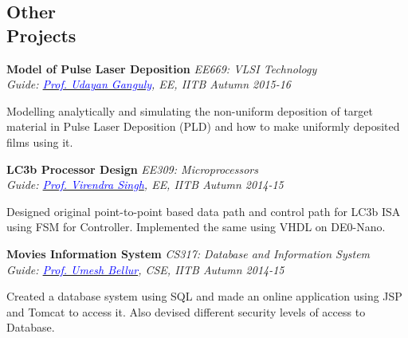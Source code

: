 \documentclass[margin,line]{res}
\newenvironment{list1}{
  \begin{list}{\ding{113}}{%
      \setlength{\itemsep}{0in}
      \setlength{\parsep}{0in} \setlength{\parskip}{0in}
      \setlength{\topsep}{0in} \setlength{\partopsep}{0in} 
      \setlength{\leftmargin}{0.17in}}}{\end{list}}
\begin{document}
\begin{resume}
\section{\sc Other \\Projects}
{\bf Model of Pulse Laser Deposition} \hfill {\it EE669: VLSI Technology}\\
{\em Guide: \href{https://www.ee.iitb.ac.in/wiki/faculty/udayan}{\textcolor{blue}{Prof. Udayan Ganguly}}, EE, IITB \hfill Autumn 2015-16}\\
\vspace*{-.15in}
\begin{list1}
\item[]Modelling analytically and simulating the non-uniform deposition of target material in Pulse Laser Deposition (PLD) and how to make uniformly deposited films using it. 
\end{list1}

\vspace*{-0.1in}

{\bf LC3b Processor Design} \hfill \textit{EE309: Microprocessors}\\
{\em Guide: \href{https://www.ee.iitb.ac.in/~viren/}{\textcolor{blue}{Prof. Virendra Singh}}, EE, IITB \hfill Autumn 2014-15}\\
\vspace*{-.15in}
\begin{list1}
\item[]Designed original point-to-point based data path and control path for LC3b ISA using FSM for Controller. Implemented the same using VHDL on DE0-Nano.
\end{list1}

\vspace*{-0.1in}

{\bf Movies Information System} \hfill \textit{CS317: Database and Information System}\\
{\em Guide: \href{https://www.cse.iitb.ac.in/~umesh/}{\textcolor{blue}{Prof. Umesh Bellur}}, CSE, IITB \hfill Autumn 2014-15}\\
\vspace*{-.15in}
\begin{list1}
\item[]Created a database system using SQL and made an online application using JSP and Tomcat to access it. Also devised different security levels of access to Database. 
\end{list1}

\vspace*{-0.1in}


\end{resume}
\end{document}
